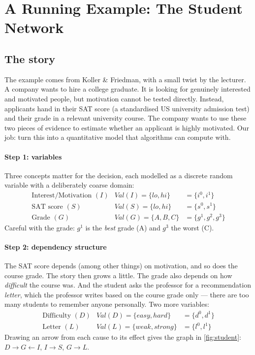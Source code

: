 \documentclass[11pt, oneside]{book}
\newcommand{\Val}{\mathit{Val}}          %
\newcommand{\vn}[1]{\mathit{#1}}         %
\let\originalsection\section
\renewcommand{\section}{\Needspace{7\baselineskip}\originalsection}
\let\originalsubsection\subsection
\renewcommand{\subsection}{\Needspace{6\baselineskip}\originalsubsection}
\begin{document}
\section{A Running Example: The Student Network}

\subsection{The story}

The example comes from Koller \& Friedman, with a small twist by the lecturer.
A company wants to hire a college graduate. It is looking for genuinely
interested and motivated people, but motivation cannot be tested directly.
Instead, applicants hand in their SAT score (a standardised US university
admission test) and their grade in a relevant university course. The company
wants to use these two pieces of evidence to estimate whether an applicant is
highly motivated. Our job: turn this into a quantitative model that algorithms
can compute with.

\paragraph{Step 1: variables} Three concepts matter for the decision, each
modelled as a discrete random variable with a deliberately coarse domain:
\[
\begin{array}{lll}
\text{Interest/Motivation } (I) & \Val(I) = \{\vn{lo}, \vn{hi}\} & = \{i^0, i^1\} \\
\text{SAT score } (S)           & \Val(S) = \{\vn{lo}, \vn{hi}\} & = \{s^0, s^1\} \\
\text{Grade } (G)               & \Val(G) = \{A, B, C\}          & = \{g^1, g^2, g^3\}
\end{array}
\]
Careful with the grade: $g^1$ is the \emph{best} grade (A) and $g^3$ the worst
(C).

\paragraph{Step 2: dependency structure} The SAT score depends (among other
things) on motivation, and so does the course grade. The story then grows a
little. The grade also depends on how \emph{difficult} the course was. And the
student asks the professor for a recommendation \emph{letter}, which the
professor writes based on the course grade only --- there are too many
students to remember anyone personally. Two more variables:
\[
\begin{array}{lll}
\text{Difficulty } (D) & \Val(D) = \{\vn{easy}, \vn{hard}\}  & = \{d^0, d^1\} \\
\text{Letter } (L)     & \Val(L) = \{\vn{weak}, \vn{strong}\} & = \{l^0, l^1\}
\end{array}
\]
Drawing an arrow from each cause to its effect gives the graph in
\cref{fig:student}: $D \to G \leftarrow I$, $I \to S$, $G \to L$.
\end{document}
